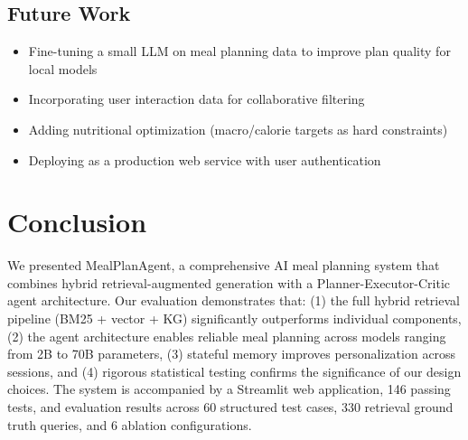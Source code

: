 \documentclass[11pt,twocolumn]{article}
\begin{document}
\subsection{Future Work}

\begin{itemize}[nosep]
    \item Fine-tuning a small LLM on meal planning data to improve plan quality for local models
    \item Incorporating user interaction data for collaborative filtering
    \item Adding nutritional optimization (macro/calorie targets as hard constraints)
    \item Deploying as a production web service with user authentication
\end{itemize}

\section{Conclusion}

We presented MealPlanAgent, a comprehensive AI meal planning system that combines hybrid retrieval-augmented generation with a Planner-Executor-Critic agent architecture. Our evaluation demonstrates that: (1) the full hybrid retrieval pipeline (BM25 + vector + KG) significantly outperforms individual components, (2) the agent architecture enables reliable meal planning across models ranging from 2B to 70B parameters, (3) stateful memory improves personalization across sessions, and (4) rigorous statistical testing confirms the significance of our design choices. The system is accompanied by a Streamlit web application, 146 passing tests, and evaluation results across 60 structured test cases, 330 retrieval ground truth queries, and 6 ablation configurations.
\end{document}
